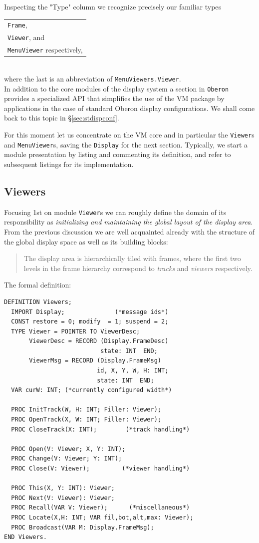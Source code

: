 Inspecting the "Type" column we recognize precisely our familiar types
\begin{table}[h!]
  \centering
  \begin{tabular}{l}
    \verb|Frame|, \\
    \verb|Viewer|, and \\
    \verb|MenuViewer| respectively,
  \end{tabular}
\end{table}
\\where the last is an abbreviation of \verb|MenuViewers.Viewer|.
\\In addition to the core modules of the display system
a section in \verb|Oberon| provides a specialized API that simplifies the use of the VM package
by applications in the case of standard Oberon display configurations.
We shall come back to this topic in \S \ref{sec:stdispconf}.

For this moment let us concentrate on the VM core and in particular the \verb|Viewer|s
and \verb|MenuViewer|s, saving the \verb|Display| for the next section.
Typically, we start a module presentation by listing and commenting its definition,
and refer to subsequent listings for its implementation.

\subsection{Viewers}
Focusing 1st on module \verb|Viewer|s we can roughly define the domain of its responsibility as
\emph{initializing and maintaining the global layout of the display area}.  From the previous discussion
we are well acquainted already with the structure of the global display space as well as its building blocks:
\begin{quote}
The display area is hierarchically tiled with frames, where the first two levels
in the frame hierarchy correspond to \emph{tracks} and \emph{viewers} respectively.
\end{quote}
The formal definition:
\begin{verbatim}
DEFINITION Viewers;
  IMPORT Display;              (*message ids*)
  CONST restore = 0; modify  = 1; suspend = 2;
  TYPE Viewer = POINTER TO ViewerDesc;
       ViewerDesc = RECORD (Display.FrameDesc)
                           state: INT  END;
       ViewerMsg = RECORD (Display.FrameMsg)
                          id, X, Y, W, H: INT;
                          state: INT  END;
  VAR curW: INT; (*currently configured width*)

  PROC InitTrack(W, H: INT; Filler: Viewer);
  PROC OpenTrack(X, W: INT; Filler: Viewer);
  PROC CloseTrack(X: INT);        (*track handling*)

  PROC Open(V: Viewer; X, Y: INT);
  PROC Change(V: Viewer; Y: INT);
  PROC Close(V: Viewer);         (*viewer handling*)

  PROC This(X, Y: INT): Viewer;
  PROC Next(V: Viewer): Viewer;
  PROC Recall(VAR V: Viewer);      (*miscellaneous*)
  PROC Locate(X,H: INT; VAR fil,bot,alt,max: Viewer);
  PROC Broadcast(VAR M: Display.FrameMsg);
END Viewers.
\end{verbatim}

